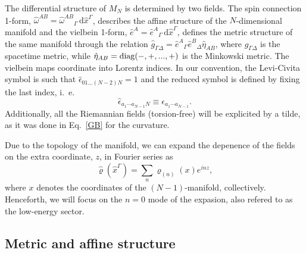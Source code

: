 \documentclass[aps,prd,12pt,superscriptaddress,showpacs,showkeys,longbibliography,reprint,nofootinbib]{revtex4-1}
\begin{document}
The differential structure of $M_N$ is determined by two fields. The spin connection 1-form, $\hat{\omega}^{AB} = \hat{\omega}^{AB}{}_{\Gamma}\,\text{d}\hat{x}^\Gamma$, describes the affine structure of the $N$-dimensional manifold and the vielbein 1-form, $\hat{e}^A=\hat{e}^{A}{}_{\Gamma}\,\text{d}\hat{x}^\Gamma$, defines the metric structure of the same manifold through the relation $\hat{g}_{\Gamma\Delta} = \hat{e}^{A}{}_{\Gamma}\hat{e}^{B}{}_{\Delta}\hat{\eta}_{AB}$, where $\hat{g}_{\Gamma\Delta}$ is the spacetime metric, while $\hat{\eta}_{AB} = \operatorname{diag}(-,+,...,+)$ is the Minkowski metric. The vielbein maps coordinate into Lorentz indices.
In our convention, the Levi-Civita symbol is such that $\hat{\epsilon}_{01...(N-2)N} = 1$ and the reduced symbol is defined by fixing the last index, i.~e.
\[\hat{\epsilon}_{a_1 \cdots a_{N-1} N} \equiv \epsilon_{a_1 \cdots a_{N-1}}.\]
Additionally, all the Riemannian fields (torsion-free) will be explicited by a tilde, as it was done in Eq.~\eqref{GB} for the curvature.

Due to the topology of the manifold, we can expand the depenence of the fields on the extra coordinate, $z$, in Fourier series as  
\begin{equation}
  \label{Fourier}
  \hat{\varrho}(\hat{x}^\Gamma)=\sum_n\varrho_{(n)}(x)e^{i n z},
\end{equation}
where $x$ denotes the coordinates of the $(N-1)$-manifold, collectively. Henceforth, we will focus on the $n=0$ mode of the expasion, also refered to as the low-energy sector.

\subsection{Metric and affine structure}
\end{document}
